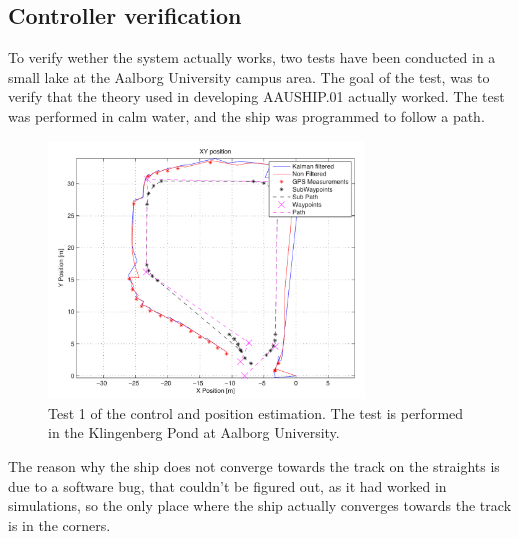 \documentclass[journal]{IEEEtran}
\begin{document}
\subsection{Controller verification}
To verify wether the system actually works, two tests have been conducted in a small lake at the Aalborg University campus area. The goal of the test, was to verify that the theory used in developing AAUSHIP.01 actually worked. The test was performed in calm water, and the ship was programmed to follow a path.  
\begin{figure}
	\begin{center}
		\includegraphics[width=8.4cm]{img/position}    %
		\caption{Test 1 of the control and position estimation. The test is performed in the Klingenberg Pond at Aalborg University.}
		\label{fig:position}               
	\end{center}                                 %
\end{figure}
The reason why the ship does not converge towards the track on the straights is due to a software bug, that couldn't be figured out, as it had worked in simulations, so the only place where the ship actually converges towards the track is in the corners.
\end{document}
